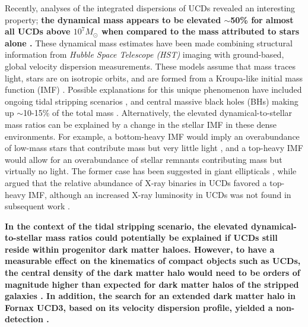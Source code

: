 \documentclass{aastex}
\begin{document}
Recently, analyses of the integrated dispersions of UCDs revealed an interesting property; \textbf{the dynamical mass appears to be elevated $\sim$50\% for almost all UCDs above $10^7 M_{\odot}$ when compared to the mass attributed to stars alone \citep[e.g.][]{hasegan05,mieske13}.} These dynamical mass estimates have been made combining structural information from \textit{Hubble Space Telescope (HST)} imaging with ground-based, global velocity dispersion measurements. These models assume that mass traces light, stars are on isotropic orbits, and are formed from a Kroupa-like initial mass function (IMF) \citep{hasegan05,mieske08,mieske13}. Possible explanations for this unique phenomenon have included ongoing tidal stripping scenarios \citep{forbes14,janz15}, and central massive black holes (BHs) making up $\sim$10-15\% of the total mass \citep{mieske13}. Alternatively, the elevated dynamical-to-stellar mass ratios can be explained by a change in the stellar IMF in these dense environments. For example, a bottom-heavy IMF would imply an overabundance of low-mass stars that contribute mass but very little light \citep{mieskekroupa08}, and a top-heavy IMF would allow for an overabundance of stellar remnants contributing mass but virtually no light. The former case has been suggested in giant ellipticals \citep[e.g.][]{vandokkum10,conroy12}, while \citet{dabringhausen12} argued that the relative abundance of X-ray binaries in UCDs favored a top-heavy IMF, although an increased X-ray luminosity in UCDs was not found in subsequent work \citep{phillips13,pandya16}.

\textbf{In the context of the tidal stripping scenario, the elevated dynamical-to-stellar mass ratios could potentially be explained if UCDs still reside within progenitor dark matter haloes. However, to have a measurable effect on the kinematics of compact objects such as UCDs, the central density of the dark matter halo would need to be orders of magnitude higher than expected for dark matter halos of the stripped galaxies \citep{tollerud11,seth14}. In addition, the search for an extended dark matter halo in Fornax UCD3, based on its velocity dispersion profile, yielded a non-detection \citep{frank11}.}
\end{document}
